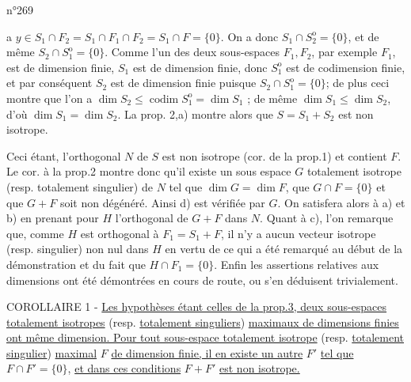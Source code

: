 \hfill n°269

a $y\in S_1\cap F_2=S_1\cap F_1\cap F_2=S_1\cap F=\{0\}$. On a donc $S_1\cap S_2^{\mathrm o}=\{0\}$, et de même $S_2\cap S_1^{\mathrm o}=\{0\}$. Comme l'un des deux sous-espaces $F_1,F_2$, par exemple $F_1$, est de dimension finie, $S_1$ est de dimension finie, donc $S_1^{\mathrm o}$ est de codimension finie, et par conséquent $S_2$ est de dimension finie puisque $S_2\cap S_1^{\mathrm o}=\{0\}$; de plus ceci montre que l'on a $\dim S_2\leq\operatorname{codim}S_1^{\mathrm o}=\dim S_1$ ; de même $\dim S_1\leq\dim S_2$, d'où $\dim S_1=\dim S_2$. La prop. 2,a) montre alors que $S=S_1+S_2$ est non isotrope.

Ceci étant, l'orthogonal $N$ de $S$ est non isotrope (cor. de la prop.1) et contient $F$. Le cor. à la prop.2 montre donc qu'il existe un sous espace $G$ totalement isotrope (resp. totalement singulier) de $N$ tel que $\dim G=\dim F$, que $G\cap F=\{0\}$ et que $G+F$ soit non dégénéré. Ainsi d) est vérifiée par $G$. On satisfera alors à a) et b) en prenant pour $H$ l'orthogonal de $G+F$ dans $N$. Quant à c), l'on remarque que, comme $H$ est orthogonal à $F_1=S_1+F$, il n'y a aucun vecteur isotrope (resp. singulier) non nul dans $H$ en vertu de ce qui a été remarqué au début de la démonstration et du fait que $H\cap F_1=\{0\}$. Enfin les assertions relatives aux dimensions ont été démontrées en cours de route, ou s'en déduisent trivialement.

COROLLAIRE 1 - \uline{Les hypothèses étant celles de la prop.3, deux sous-espaces totalement isotropes} (resp. \uline{totalement singuliers}) \uline{maximaux de dimensions finies ont même dimension. Pour tout sous-espace totalement isotrope} (resp. \uline{totalement singulier}) \uline{maximal} $F$ \uline{de dimension finie, il en existe un autre} $F'$ \uline{tel que} $F\cap F'=\{0\}$, \uline{et dans ces conditions} $F+F'$ \uline{est non isotrope.}
